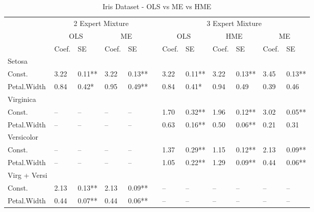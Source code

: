 \documentclass[12pt]{article}
\begin{document}
\begin{landscape}
\begin{table} 
	\caption{Iris Dataset - OLS vs ME vs HME}
	\begin{threeparttable}
		\begin{tabular}[l]{l l l l l l l l l l l l}
  \cmidrule{1-12}

  & \multicolumn{4}{c}{2 Expert Mixture} & & \multicolumn{6}{c}{3 Expert Mixture} \\
  \cmidrule(r){2-5}  \cmidrule(r){7-12}
  & \multicolumn{2}{c}{OLS}  & \multicolumn{2}{c}{ME} & & \multicolumn{2}{c}{OLS}  & \multicolumn{2}{c}{HME}  & \multicolumn{2}{c}{ME} \\
  \cmidrule(r){2-3}  \cmidrule(r){4-5}  \cmidrule(r){7-8}  \cmidrule(r){9-10}  \cmidrule(r){11-12}
  & Coef. & SE & Coef. & SE && Coef. & SE & Coef. & SE & Coef. & SE     \\
  \cmidrule{1-12}
  
  Setosa \\
  \cmidrule(r){1-1}
  Const.             & 3.22 & 0.11** & 3.22 & 0.13** && 3.22  & 0.11** & 3.22 & 0.13** & 3.45 & 0.13**       \\
  Petal.Width        & 0.84 & 0.42*  & 0.95 & 0.49** && 0.84  & 0.41*  & 0.94 & 0.49   & 0.39 & 0.46         \\[0.3cm]
  
  Virginica \\
  \cmidrule(r){1-1}
  Const.             & --   & --     & --   & --     && 1.70  & 0.32** & 1.96 & 0.12** & 3.02 & 0.05**       \\
  Petal.Width        & --   & --     & --   & --     && 0.63  & 0.16** & 0.50 & 0.06** & 0.21 & 0.31         \\[0.3cm]
  
  Versicolor \\
  \cmidrule(r){1-1}
  Const.             & --   & --     & --   & --     && 1.37  & 0.29** & 1.15 & 0.12** & 2.13 & 0.09**       \\
  Petal.Width        & --   & --     & --   & --     && 1.05  & 0.22** & 1.29 & 0.09** & 0.44 & 0.06**       \\[0.3cm]

  Virg + Versi \\
  \cmidrule(r){1-1}
  Const.             & 2.13 & 0.13** & 2.13 & 0.09** && --    & --     & --   & --     & --   & --       \\
  Petal.Width        & 0.44 & 0.07** & 0.44 & 0.06** && --    & --     & --   & --     & --   & --       \\[0.3cm]


\end{tabular}
\end{threeparttable}
\end{table}
\end{landscape}
\end{document}
